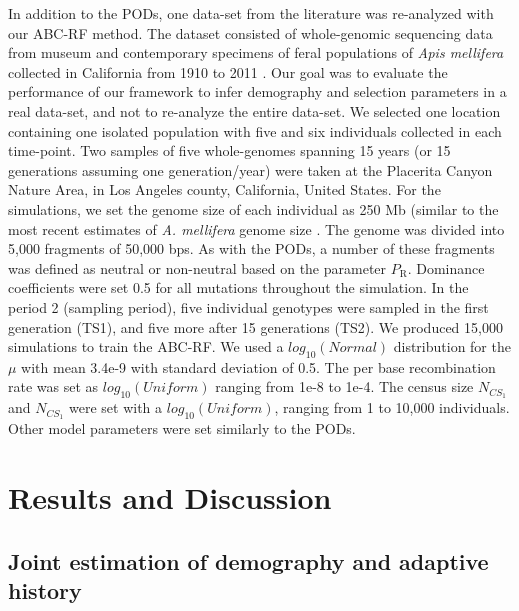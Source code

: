 \documentclass[a4paper, 12pt]{article}
\begin{document}
In addition to the PODs, one data-set from the literature was re-analyzed with our ABC-RF method. The dataset consisted of whole-genomic sequencing data from museum and contemporary specimens of feral populations of \textit{Apis mellifera}  collected in California from 1910 to 2011 \citep{Cridland:2018fx}. Our goal was to evaluate the performance of our framework to infer demography and selection parameters in a real data-set, and not to re-analyze the entire data-set. We selected one location containing one isolated population with five and six individuals collected in each time-point. Two samples of five whole-genomes spanning 15 years (or 15 generations assuming one generation/year) were taken at the Placerita Canyon Nature Area, in Los Angeles county, California, United States. For the simulations, we set the genome size of each individual as 250 Mb (similar to the most recent estimates of \textit{A. mellifera} genome size \citep{Elsik:2014hf}. The genome was divided into 5,000 fragments of 50,000 bps. As with the PODs, a number of these fragments was defined as neutral or non-neutral based on the parameter $P_{\mathrm{R}}$. Dominance coefficients were set 0.5 for all mutations throughout the simulation. In the period 2 (sampling period), five individual genotypes were sampled in the first generation (TS1), and five more after 15 generations (TS2). We produced 15,000 simulations to train the ABC-RF. We used a $log_{10}(Normal)$ distribution for the $\mu$ with mean 3.4e-9 with standard deviation of 0.5. The per base recombination rate was set as $log_{10}(Uniform)$ ranging from 1e-8 to 1e-4. The census size $N_{CS_{1}}$ and $N_{CS_{1}}$ were set with a $log_{10}(Uniform)$, ranging from 1 to 10,000 individuals. Other model parameters were set similarly to the PODs.

\section*{Results and Discussion}

\subsection*{Joint estimation of demography and adaptive history}
\end{document}
